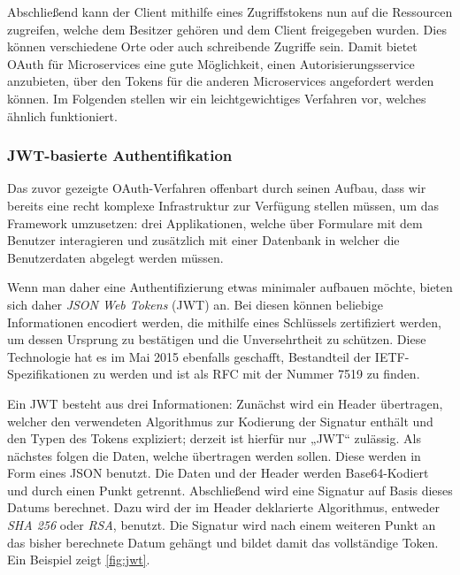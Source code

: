 Abschließend kann der Client mithilfe eines Zugriffstokens nun auf die Ressourcen zugreifen, welche dem Besitzer gehören und dem Client freigegeben wurden. Dies können verschiedene Orte oder auch schreibende Zugriffe sein. Damit bietet OAuth für Microservices eine gute Möglichkeit, einen Autorisierungsservice anzubieten, über den Tokens für die anderen Microservices angefordert werden können. Im Folgenden stellen wir ein leichtgewichtiges Verfahren vor, welches ähnlich funktioniert.


\subsubsection{JWT-basierte Authentifikation}

Das zuvor gezeigte OAuth-Verfahren offenbart durch seinen Aufbau, dass wir bereits eine recht komplexe Infrastruktur zur Verfügung stellen müssen, um das Framework umzusetzen: drei Applikationen, welche über Formulare mit dem Benutzer interagieren und zusätzlich mit einer Datenbank in welcher die Benutzerdaten abgelegt werden müssen.

Wenn man daher eine Authentifizierung etwas minimaler aufbauen möchte, bieten sich daher \textit{JSON Web Tokens} (JWT) an. Bei diesen können beliebige Informationen encodiert werden, die mithilfe eines Schlüssels zertifiziert werden, um dessen Ursprung zu bestätigen und die Unversehrtheit zu schützen. Diese Technologie hat es im Mai 2015 ebenfalls geschafft, Bestandteil der IETF-Spezifikationen zu werden und ist als RFC mit der Nummer 7519 zu finden. \cite{RFC7519}

Ein JWT besteht aus drei Informationen: Zunächst wird ein Header übertragen, welcher den verwendeten Algorithmus zur Kodierung der Signatur enthält und den Typen des Tokens expliziert; derzeit ist hierfür nur „JWT“ zulässig. Als nächstes folgen die Daten, welche übertragen werden sollen. Diese werden in Form eines JSON benutzt. Die Daten und der Header werden Base64-Kodiert und durch einen Punkt getrennt. Abschließend wird eine Signatur auf Basis dieses Datums berechnet. Dazu wird der im Header deklarierte Algorithmus, entweder \textit{SHA 256} oder \textit{RSA}, benutzt. Die Signatur wird nach einem weiteren Punkt an das bisher berechnete Datum gehängt und bildet damit das vollständige Token. Ein Beispiel zeigt \autoref{fig:jwt}.


